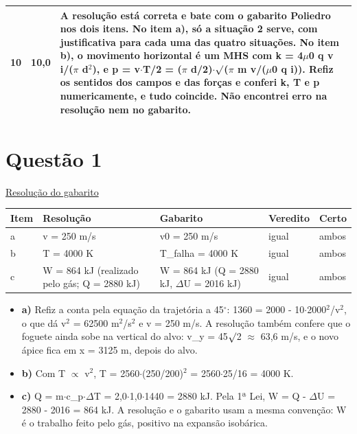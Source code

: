 \documentclass{article}%
\begin{document}
\begin{longtable}{@{}c c p{}@{}}
10 & 10,0 & A resolução está correta e bate com o gabarito Poliedro nos dois itens. No item a), só a situação 2 serve, com justificativa para cada uma das quatro situações. No item b), o movimento horizontal é um MHS com k = 4$\mu$0 q v i/($\pi$ d$^2$), e p = v$\cdot$T/2 = ($\pi$ d/2)$\cdot$$\surd$($\pi$ m v/($\mu$0 q i)). Refiz os sentidos dos campos e das forças e conferi k, T e p numericamente, e tudo coincide. Não encontrei erro na resolução nem no gabarito. \\
\bottomrule\end{longtable}%
\section*{Questão 1}%
\href{https://poliedroresolve.sistemapoliedro.com.br/vestibulares/ime/2027/ime-2-fase-dia-2-27-10-2026-2-fase-dia-2/dissertativa-1-fisica-2-fase-dia-2-ime-2027}{Resolução do gabarito}\par\smallskip%
\begin{longtable}{@{}p{} p{} p{} p{} p{}@{}}\toprule Item & Resolução & Gabarito & Veredito & Certo \\ \midrule
a & v = 250 m/s & v0 = 250 m/s & igual & ambos \\
b & T = 4000 K & T\_falha = 4000 K & igual & ambos \\
c & W = 864 kJ (realizado pelo gás; Q = 2880 kJ) & W = 864 kJ (Q = 2880 kJ, $\Delta$U = 2016 kJ) & igual & ambos \\
\bottomrule\end{longtable}%
\begin{itemize}%
\item%
\textbf{a)} Refiz a conta pela equação da trajetória a 45$^\circ$: 1360 = 2000 - 10$\cdot$2000$^2$/v$^2$, o que dá v$^2$ = 62500 m$^2$/s$^2$ e v = 250 m/s. A resolução também confere que o foguete ainda sobe na vertical do alvo: v\_y = 45$\surd$2 $\approx$ 63,6 m/s, e o novo ápice fica em x = 3125 m, depois do alvo.%
\item%
\textbf{b)} Com T $\propto$ v$^2$, T = 2560$\cdot$(250/200)$^2$ = 2560$\cdot$25/16 = 4000 K.%
\item%
\textbf{c)} Q = m$\cdot$c\_p$\cdot$$\Delta$T = 2,0$\cdot$1,0$\cdot$1440 = 2880 kJ. Pela 1ª Lei, W = Q - $\Delta$U = 2880 - 2016 = 864 kJ. A resolução e o gabarito usam a mesma convenção: W é o trabalho feito pelo gás, positivo na expansão isobárica.%
\end{itemize}%
\end{document}
